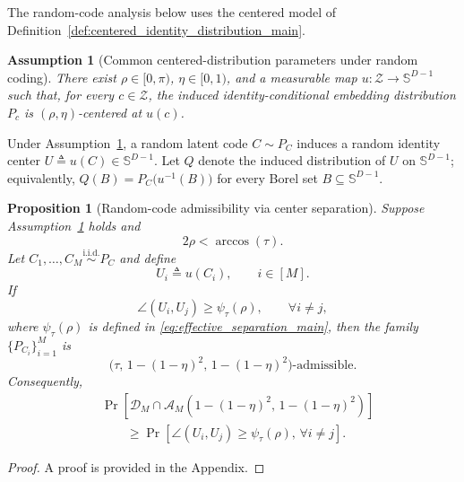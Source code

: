 \documentclass[journal]{IEEEtran}
\newtheorem{proposition}[theorem]{Proposition}
\newtheorem{assumption}{Assumption}
\begin{document}
\begin{bibunit}
The random-code analysis below uses the centered model of Definition~\ref{def:centered_identity_distribution_main}.

\begin{assumption}[Common centered-distribution parameters under random coding]
\label{ass:random_centered_model}
%
There exist $\rho\in[0,\pi)$, $\eta\in[0,1)$, and a measurable map $u:\mathcal Z\to\mathbb S^{D-1}$ such that, for every $c\in\mathcal Z$, the induced identity-conditional embedding distribution $P_c$ is $(\rho,\eta)$-centered at $u(c)$.
%
\end{assumption}

Under Assumption~\ref{ass:random_centered_model}, a random latent code $C\sim P_C$ induces a random identity center $U\triangleq u(C)\in\mathbb S^{D-1}$. Let $Q$ denote the induced distribution of $U$ on $\mathbb S^{D-1}$; equivalently, $Q(B)=P_C\bigl(u^{-1}(B)\bigr)$ for every Borel set $B\subseteq\mathbb S^{D-1}$.


\begin{proposition}[Random-code admissibility via center separation]
\label{prop:random_centered_admissibility_main}
%
Suppose Assumption~\ref{ass:random_centered_model} holds and
%
\begin{equation}
2\rho<\arccos(\tau).
\label{eq:random_intra_condition}
\end{equation}
%
Let $C_1,\ldots,C_M\stackrel{\mathrm{i.i.d.}}{\sim}P_C$ and define
%
\begin{equation}
U_i\triangleq u(C_i),\qquad i\in[M].
\end{equation}
%
If
%
\begin{equation}
\angle(U_i,U_j)\ge\psi_\tau(\rho), \qquad \forall i\ne j,
\label{eq:random_pairwise_center_condition}
\end{equation}
%
where $\psi_\tau(\rho)$ is defined in \eqref{eq:effective_separation_main}, then the family $\{P_{C_i}\}_{i=1}^M$ is
\[
\bigl( \tau,\, 1-(1-\eta)^2,\, 1-(1-\eta)^2 \bigr)\text{-admissible}.
\]
Consequently,
%
\begin{align}
&\Pr \left[ \mathcal D_M\cap \mathcal A_M \left(
1-(1-\eta)^2,\, 1-(1-\eta)^2 \right) \right]
\nonumber\\
&\qquad \ge
\Pr \left[ \angle(U_i,U_j)\ge\psi_\tau(\rho), \, \forall i\ne j
\right].
\label{eq:random_admissibility_via_centers_main}
\end{align}
\end{proposition}

\begin{proof}
A proof is provided in the Appendix.
\end{proof}


\end{bibunit}
\end{document}
